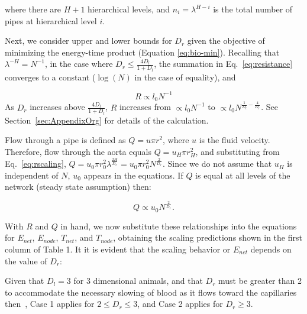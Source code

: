 \documentclass[12pt]{article}
\begin{document}
\noindent where there are $H+1$ hierarchical levels, and $n_i = \lambda^{H-i}$
is the total number of pipes at hierarchical level $i$.  

Next, we consider upper and lower bounds for $D_r$ given the objective
of minimizing the energy-time product (Equation \ref{eq:bio-min}).  Recalling
that $\lambda^{-H} = N^{-1}$, in the case
where $D_r \leq \frac{4D_l}{1+D_l}$, the summation in Eq.~\ref{eq:resistance} converges to a
constant ($\log(N)$ in the case of equality), and 

\begin{equation}
R \propto l_0 N^{-1} 
\end {equation}
As
$D_r$ increases above $\frac{4D_l}{1+D_l}$, $R$ increases from $\propto l_0 N^{-1}$ to $\propto
l_0 N^{\frac{1}{D_l} - \frac{4}{D_r}}$. 
See Section~\ref{sec:AppendixOrg} for details of the calculation.

Flow through a pipe is defined as $Q = u\pi r^2$, where $u$ is the fluid
velocity. 
Therefore, flow through the aorta equals $Q = u_H \pi r_{H}^2$, and
substituting from Eq.~\ref{eq:rscaling}, $Q = u_0 \pi r_0^2
\lambda^{\frac{2H}{D_r}} = u_0 \pi r_0^2N^{\frac{2}{D_r}} $.  Since we do not assume
that $u_H$ is independent of $N$, $u_0$ appears in the 
equations. If $Q$ is equal at all levels of the network (steady state
assumption) then:

\begin{equation}
Q \propto u_0 N^{\frac{2}{D_r}}.
\end{equation}


With $R$ and $Q$ in hand, we now substitute these relationships into
the equations for $E_{net}$, $E_{node}$, $T_{net}$, and $T_{node}$,
obtaining the scaling predictions shown in the first column of Table 1.
It it is evident that the scaling behavior or $E_{net}$ depends on the value of $D_r$:


\begin{caseof}

\end{caseof}



Given that $D_l = 3$ for 3 dimensional animals, and that $D_r$ must be greater than 2 to accommodate the necessary slowing of blood as it flows toward the capillaries then~\cite{west97}, Case 1 applies for $2 \leq D_r \le 3$, and Case 2 applies for $D_r \geq 3$.
 
\end{document}
